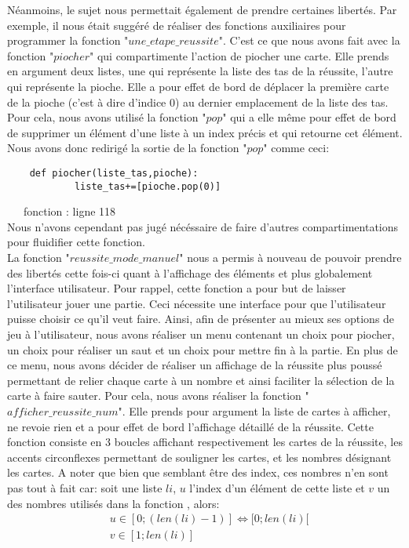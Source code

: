 \documentclass[10pt,a4paper,french,titlepage]{article}
\theoremstyle{definition}
\begin{document}
Néanmoins, le sujet nous permettait également de prendre certaines libertés. Par exemple, il nous était suggéré de réaliser des fonctions auxiliaires pour programmer la fonction "$une\_etape\_reussite$". C'est ce que nous avons fait avec la fonction "$piocher$" qui compartimente l'action de piocher une carte. Elle prends en argument deux listes, une qui représente la liste des tas de la réussite, l'autre qui représente la pioche. Elle a  pour effet de bord de déplacer la première carte de la pioche (c'est à dire d'indice 0) au dernier emplacement de la liste des tas. Pour cela, nous  avons utilisé la fonction "$pop$" qui a elle même pour effet de bord de supprimer un élément d'une liste à un index précis et qui retourne cet élément. Nous avons donc redirigé la sortie de la fonction "$pop$" comme ceci:\\
\begin{lstlisting}
	def piocher(liste_tas,pioche):
    		liste_tas+=[pioche.pop(0)]

\end{lstlisting}

~~~fonction : ligne 118\\



Nous n'avons cependant pas jugé nécéssaire de faire d'autres compartimentations pour fluidifier cette fonction.\\

La fonction "$reussite\_mode\_manuel$" nous a permis à nouveau de pouvoir prendre des libertés cette fois-ci quant à l'affichage des éléments et plus globalement l'interface utilisateur. Pour rappel, cette fonction a pour but de laisser l'utilisateur jouer une partie. Ceci nécessite une interface pour que l'utilisateur puisse choisir ce qu'il veut faire. Ainsi, afin de présenter au mieux ses options de jeu à l'utilisateur, nous avons réaliser un menu contenant un choix pour piocher, un choix pour réaliser un saut et un choix pour mettre fin à la partie. En plus de ce menu, nous avons décider de réaliser un affichage de la réussite plus poussé permettant de relier chaque carte à un nombre et ainsi faciliter la sélection de la carte à faire sauter. 
Pour cela, nous avons réaliser la fonction "$afficher\_reussite\_num$". Elle prends pour argument la liste de cartes à afficher, ne revoie rien et a pour effet de bord l'affichage détaillé de la réussite. Cette fonction consiste en 3 boucles affichant respectivement les cartes de la réussite, les
accents circonflexes permettant de souligner les cartes, et les nombres désignant les cartes. A noter que bien que semblant être des index, ces nombres n'en sont pas tout à fait car: soit une liste $li$, $u$ l'index d'un élément de cette liste et $v$ un des nombres utilisés dans la fonction , alors:
\begin{align*}
	&u \in [0;(len(li)-1)] \iff [0;len(li)[\\
	&v \in [1;len(li)]
\end{align*}
\end{document}
